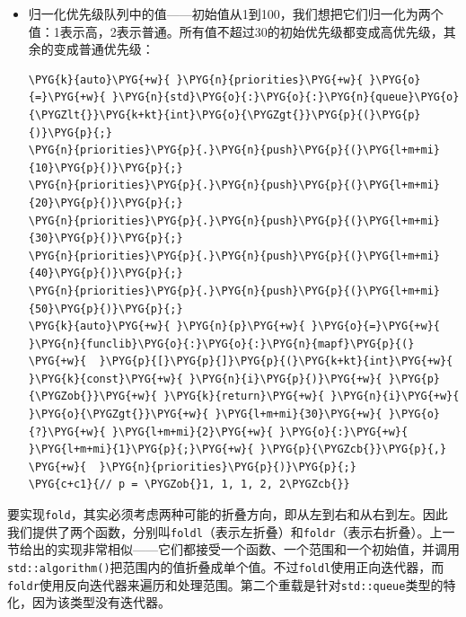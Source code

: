 \begin{itemize}
\item 归一化优先级队列中的值——初始值从1到100，我们想把它们归一化为两个值：1表示高，2表示普通。所有值不超过30的初始优先级都变成高优先级，其余的变成普通优先级：



\begin{codeblockbg}
\begin{Verbatim}[commandchars=\\\{\},breaklines=true,breakanywhere=true,fontsize=\codefont,xleftmargin=17bp]
\PYG{k}{auto}\PYG{+w}{ }\PYG{n}{priorities}\PYG{+w}{ }\PYG{o}{=}\PYG{+w}{ }\PYG{n}{std}\PYG{o}{:}\PYG{o}{:}\PYG{n}{queue}\PYG{o}{\PYGZlt{}}\PYG{k+kt}{int}\PYG{o}{\PYGZgt{}}\PYG{p}{(}\PYG{p}{)}\PYG{p}{;}
\PYG{n}{priorities}\PYG{p}{.}\PYG{n}{push}\PYG{p}{(}\PYG{l+m+mi}{10}\PYG{p}{)}\PYG{p}{;}
\PYG{n}{priorities}\PYG{p}{.}\PYG{n}{push}\PYG{p}{(}\PYG{l+m+mi}{20}\PYG{p}{)}\PYG{p}{;}
\PYG{n}{priorities}\PYG{p}{.}\PYG{n}{push}\PYG{p}{(}\PYG{l+m+mi}{30}\PYG{p}{)}\PYG{p}{;}
\PYG{n}{priorities}\PYG{p}{.}\PYG{n}{push}\PYG{p}{(}\PYG{l+m+mi}{40}\PYG{p}{)}\PYG{p}{;}
\PYG{n}{priorities}\PYG{p}{.}\PYG{n}{push}\PYG{p}{(}\PYG{l+m+mi}{50}\PYG{p}{)}\PYG{p}{;}
\PYG{k}{auto}\PYG{+w}{ }\PYG{n}{p}\PYG{+w}{ }\PYG{o}{=}\PYG{+w}{ }\PYG{n}{funclib}\PYG{o}{:}\PYG{o}{:}\PYG{n}{mapf}\PYG{p}{(}
\PYG{+w}{  }\PYG{p}{[}\PYG{p}{]}\PYG{p}{(}\PYG{k+kt}{int}\PYG{+w}{ }\PYG{k}{const}\PYG{+w}{ }\PYG{n}{i}\PYG{p}{)}\PYG{+w}{ }\PYG{p}{\PYGZob{}}\PYG{+w}{ }\PYG{k}{return}\PYG{+w}{ }\PYG{n}{i}\PYG{+w}{ }\PYG{o}{\PYGZgt{}}\PYG{+w}{ }\PYG{l+m+mi}{30}\PYG{+w}{ }\PYG{o}{?}\PYG{+w}{ }\PYG{l+m+mi}{2}\PYG{+w}{ }\PYG{o}{:}\PYG{+w}{ }\PYG{l+m+mi}{1}\PYG{p}{;}\PYG{+w}{ }\PYG{p}{\PYGZcb{}}\PYG{p}{,}
\PYG{+w}{  }\PYG{n}{priorities}\PYG{p}{)}\PYG{p}{;}
\PYG{c+c1}{// p = \PYGZob{}1, 1, 1, 2, 2\PYGZcb{}}
\end{Verbatim}
\end{codeblockbg}


\end{itemize}


要实现\texttt{fold}，其实必须考虑两种可能的折叠方向，即从左到右和从右到左。因此我们提供了两个函数，分别叫\texttt{foldl}（表示左折叠）和\texttt{foldr}（表示右折叠）。上一节给出的实现非常相似——它们都接受一个函数、一个范围和一个初始值，并调用\texttt{std::\allowbreak{}algorithm()}把范围内的值折叠成单个值。不过\texttt{foldl}使用正向迭代器，而\texttt{foldr}使用反向迭代器来遍历和处理范围。第二个重载是针对\texttt{std::\allowbreak{}queue}类型的特化，因为该类型没有迭代器。


